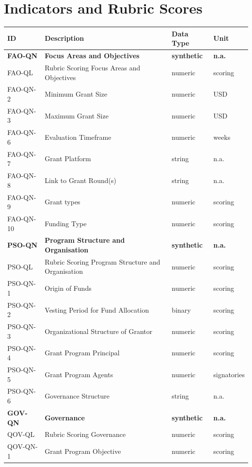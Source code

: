 \documentclass[a4,10pt]{article}
\begin{document}
\section{Indicators and Rubric Scores}\label{sec_16}
\begin{table}[ht!]
\centering
\footnotesize
\begin{tabular}{l|l|l|l}
\textbf{ID} & \textbf{Description} & \textbf{Data Type} & \textbf{Unit} \\ \hline
\textbf{FAO-QN} & \textbf{Focus Areas and Objectives} & \textbf{synthetic} & \textbf{n.a.} \\ \hline
FAO-QL & Rubric Scoring Focus Areas and Objectives & numeric & scoring \\ \hline
FAO-QN-2 & Minimum Grant Size & numeric & USD \\ \hline
FAO-QN-3 & Maximum Grant Size & numeric & USD \\ \hline
FAO-QN-6 & Evaluation Timeframe & numeric & weeks \\ \hline
FAO-QN-7 & Grant Platform & string & n.a. \\ \hline
FAO-QN-8 & Link to Grant Round(s) & string & n.a. \\ \hline
FAO-QN-9 & Grant types & numeric & scoring \\ \hline
FAO-QN-10 & Funding Type & numeric & scoring \\ \hline
\textbf{PSO-QN} & \textbf{Program Structure and Organisation} & \textbf{synthetic} & \textbf{n.a.} \\ \hline
PSO-QL & Rubric Scoring Program Structure and Organisation & numeric & scoring \\ \hline
PSO-QN-1 & Origin of Funds & numeric & scoring \\ \hline
PSO-QN-2 & Vesting Period for Fund Allocation & binary & scoring \\ \hline
PSO-QN-3 & Organizational Structure of Grantor & numeric & scoring \\ \hline
PSO-QN-4 & Grant Program Principal & numeric & scoring \\ \hline
PSO-QN-5 & Grant Program Agents & numeric & signatories \\ \hline
PSO-QN-6 & Governance Structure & string & n.a. \\ \hline
\textbf{GOV-QN} & \textbf{Governance} & \textbf{synthetic} & \textbf{n.a.} \\ \hline
QOV-QL & Rubric Scoring Governance & numeric & scoring \\ \hline
QOV-QN-1 & Grant Program Objective & numeric & scoring \\ \hline

\end{tabular}
\end{table}
\end{document}

